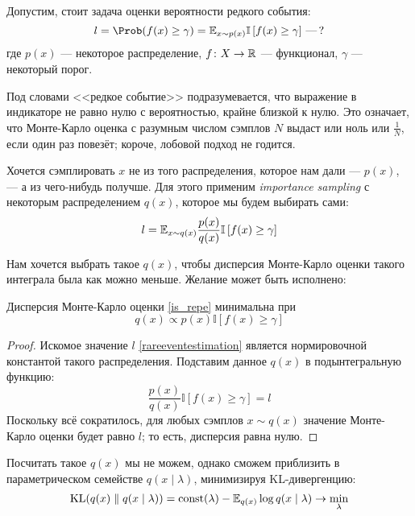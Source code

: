 Допустим, стоит задача оценки вероятности редкого события:
\begin{equation}\label{rareeventestimation}
l = \Prob(f(x) \ge \gamma) = \E_{x \sim p(x)} \mathbb{I}\left[ f(x) \ge \gamma \right] \,\text{---}\, ?
\end{equation}
где $p(x)$ --- некоторое распределение, $f \colon X \to \mathbb{R}$ --- функционал, $\gamma$ --- некоторый порог. 

Под словами <<редкое событие>> подразумевается, что выражение в индикаторе не равно нулю с вероятностью, крайне близкой к нулю. Это означает, что Монте-Карло оценка с разумным числом сэмплов $N$ выдаст или ноль или $\frac{1}{N}$, если один раз повезёт; короче, лобовой подход не годится.

Хочется сэмплировать $x$ не из того распределения, которое нам дали --- $p(x)$, --- а из чего-нибудь получше. Для этого применим \emph{importance sampling} с некоторым распределением $q(x)$, которое мы будем выбирать сами:
\begin{equation}\label{is_repe}
l = \mathbb{E}_{x \sim q(x)} \frac{p(x)}{q(x)} \mathbb{I}\left[ f(x) \ge \gamma \right]
\end{equation}

Нам хочется выбрать такое $q(x)$, чтобы дисперсия Монте-Карло оценки такого интеграла была как можно меньше. Желание может быть исполнено:
\begin{proposition}
Дисперсия Монте-Карло оценки \eqref{is_repe} минимальна при 
\begin{equation}\label{optimal_q_is_repe}
q(x) \propto p(x)\mathbb{I}\left[ f(x) \ge \gamma \right]
\end{equation}

\begin{proof}
Искомое значение $l$ \eqref{rareeventestimation} является нормировочной константой такого распределения. Подставим данное $q(x)$ в подынтегральную функцию:
$$
\frac{p(x)}{q(x)} \mathbb{I}\left[ f(x) \ge \gamma \right] = l
$$
Поскольку всё сократилось, для любых сэмплов $x \sim q(x)$ значение Монте-Карло оценки будет равно $l$; то есть, дисперсия равна нулю.
\end{proof}
\end{proposition}

Посчитать такое $q(x)$ мы не можем, однако сможем приблизить в параметрическом семействе $q(x \mid \lambda)$, минимизируя KL-дивергенцию:
$$\operatorname{KL}(q(x) \parallel q(x \mid \lambda)) = \operatorname{const}(\lambda) - \mathbb{E}_{q(x)} \log q(x \mid \lambda) \to \min_\lambda$$

